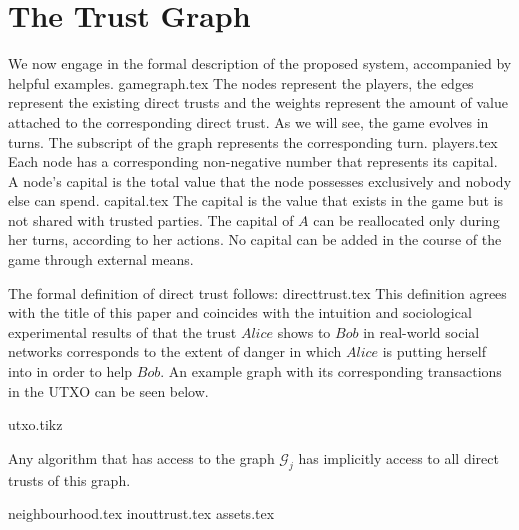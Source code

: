 \section{The Trust Graph}
  We now engage in the formal description of the proposed system, accompanied by helpful examples.
  {gamegraph.tex}
  The nodes represent the players, the edges represent the existing direct trusts and the weights represent the amount of
  value attached to the corresponding direct trust. As we will see, the game evolves in turns. The subscript of the graph
  represents the corresponding turn.
  {players.tex}
  Each node has a corresponding non-negative number that represents its capital. A node's capital is the total value that
  the node possesses exclusively and nobody else can spend.
  {capital.tex}
  The capital is the value that exists in the game but is not shared with trusted parties. The capital of $A$ can be
  reallocated only during her turns, according to her actions. No capital can be added in the course of the game through
  external means.

  The formal definition of direct trust follows:
  {directtrust.tex}
  This definition agrees with the title of this paper and coincides with the intuition and sociological experimental results
  of \cite{kmrs} that the trust $Alice$ shows to $Bob$ in real-world social networks corresponds to the extent of danger in
  which $Alice$ is putting herself into in order to help $Bob$. An example graph with its corresponding transactions in the
  UTXO can be seen below.

  {utxo.tikz}

  Any algorithm that has access to the graph $\mathcal{G}_j$ has implicitly access to all direct trusts of this graph.

  {neighbourhood.tex}
  {inouttrust.tex}
  {assets.tex}

